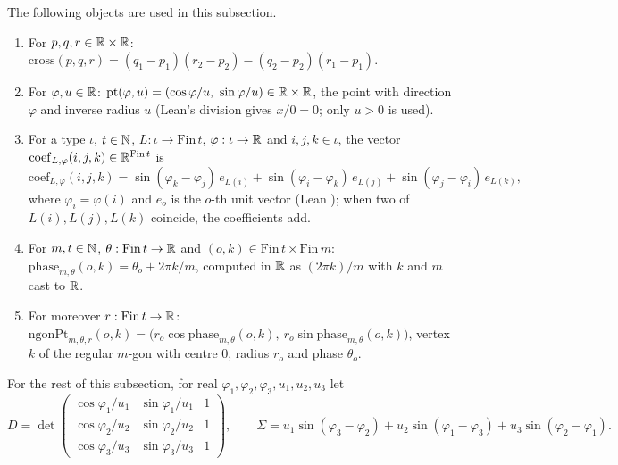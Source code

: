 \begin{definition}\label{ec:def:polar}
The following objects are used in this subsection.
\begin{enumerate}[label=(\roman*)]
\item For $p,q,r\in\mathbb R\times\mathbb R$:
  $\mathrm{cross}(p,q,r)=(q_1-p_1)(r_2-p_2)-(q_2-p_2)(r_1-p_1)$.
\item For $\varphi,u\in\mathbb R$: $\mathrm{pt}(\varphi,u)=(\cos\varphi/u,\ \sin\varphi/u)\in\R\times\R$, the point with
  direction $\varphi$ and inverse radius $u$ (Lean's division gives $x/0=0$; only $u>0$ is used).
\item For a type $\iota$, $t\in\mathbb N$, $L:\iota\to\mathrm{Fin}\,t$, $\varphi:\iota\to\mathbb R$ and $i,j,k\in\iota$, the vector
  $\mathrm{coef}_{L,\varphi}(i,j,k)\in\mathbb R^{\mathrm{Fin}\,t}$ is
  \begin{equation*}
  \mathrm{coef}_{L,\varphi}(i,j,k)=\sin(\varphi_k-\varphi_j)\,e_{L(i)}+\sin(\varphi_i-\varphi_k)\,e_{L(j)}
  +\sin(\varphi_j-\varphi_i)\,e_{L(k)},
  \end{equation*}
  where $\varphi_i=\varphi(i)$ and $e_o$ is the $o$-th unit vector (Lean ); when two of
  $L(i),L(j),L(k)$ coincide, the coefficients add.
\item For $m,t\in\mathbb N$, $\theta:\mathrm{Fin}\,t\to\mathbb R$ and $(o,k)\in\mathrm{Fin}\,t\times\mathrm{Fin}\,m$:
  $\mathrm{phase}_{m,\theta}(o,k)=\theta_o+2\pi k/m$, computed in $\mathbb R$ as $(2\pi k)/m$ with $k$ and $m$ cast to $\mathbb R$.
\item For moreover $r:\mathrm{Fin}\,t\to\mathbb R$: $\mathrm{ngonPt}_{m,\theta,r}(o,k)=\bigl(r_o\cos\mathrm{phase}_{m,\theta}(o,k),\
  r_o\sin\mathrm{phase}_{m,\theta}(o,k)\bigr)$, vertex $k$ of the regular $m$-gon with centre $0$, radius $r_o$ and
  phase $\theta_o$.
\end{enumerate}
\end{definition}

For the rest of this subsection, for real $\varphi_1,\varphi_2,\varphi_3,u_1,u_2,u_3$ let
\begin{equation*}
D=\det\begin{pmatrix}\cos\varphi_1/u_1&\sin\varphi_1/u_1&1\\ \cos\varphi_2/u_2&\sin\varphi_2/u_2&1\\
\cos\varphi_3/u_3&\sin\varphi_3/u_3&1\end{pmatrix},\qquad
\Sigma=u_1\sin(\varphi_3-\varphi_2)+u_2\sin(\varphi_1-\varphi_3)+u_3\sin(\varphi_2-\varphi_1).
\end{equation*}

